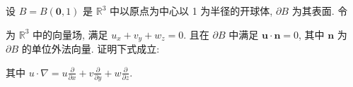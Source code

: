 \par{}
设 $B = B(\mathbf{0}, 1)$ 是 $\mathbb{R}^3$ 中以原点为中心以 1 为半径的开球体, $\partial B$ 为其表面. 令\par
\nopagebreak[4]
\par{}
为 $\mathbb{R}^3$ 中的向量场, 满足 $u_x + v_y + w_z = 0$. 且在 $\partial B$ 中满足 $\pmb{u} \cdot \pmb{n} = 0$, 其中 $\pmb{n}$ 为 $\partial B$ 的单位外法向量. 证明下式成立:\par
\nopagebreak[4]
其中  $u \cdot \nabla = u \frac{\partial}{\partial x} + v \frac{\partial}{\partial y} + w \frac{\partial}{\partial z}.$\par
